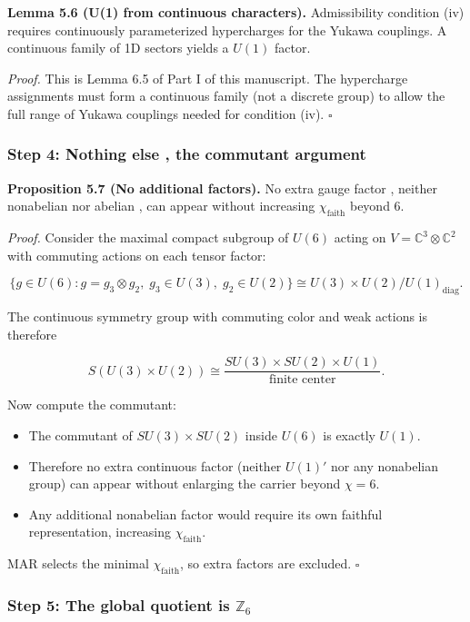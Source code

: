 \textbf{Lemma 5.6 (U(1) from continuous characters).} Admissibility condition (iv) requires continuously parameterized hypercharges for the Yukawa couplings. A continuous family of 1D sectors yields a \(U(1)\) factor.

\emph{Proof.} This is Lemma 6.5 of Part I of this manuscript. The hypercharge assignments must form a continuous family (not a discrete group) to allow the full range of Yukawa couplings needed for condition (iv). \(\square\)

\subsubsection{Step 4: Nothing else , the commutant argument}\label{step-4-nothing-else--the-commutant-argument}

\textbf{Proposition 5.7 (No additional factors).} No extra gauge factor , neither nonabelian nor abelian , can appear without increasing \(\chi_{\mathrm{faith}}\) beyond 6.

\emph{Proof.} Consider the maximal compact subgroup of \(U(6)\) acting on \(V = \mathbb{C}^3 \otimes \mathbb{C}^2\) with commuting actions on each tensor factor:

\[\{g \in U(6) : g = g_3 \otimes g_2,\; g_3 \in U(3),\; g_2 \in U(2)\} \cong U(3) \times U(2) / U(1)_{\mathrm{diag}}.\]

The continuous symmetry group with commuting color and weak actions is therefore

\[S(U(3) \times U(2)) \cong \frac{SU(3) \times SU(2) \times U(1)}{\text{finite center}}.\]

Now compute the commutant:

\begin{itemize}
\tightlist
\item
  The commutant of \(SU(3) \times SU(2)\) inside \(U(6)\) is exactly \(U(1)\).
\item
  Therefore no extra continuous factor (neither \(U(1)'\) nor any nonabelian group) can appear without enlarging the carrier beyond \(\chi = 6\).
\item
  Any additional nonabelian factor would require its own faithful representation, increasing \(\chi_{\mathrm{faith}}\).
\end{itemize}

MAR selects the minimal \(\chi_{\mathrm{faith}}\), so extra factors are excluded. \(\square\)

\subsubsection{\texorpdfstring{Step 5: The global quotient is \(\mathbb{Z}_6\)}{Step 5: The global quotient is \textbackslash mathbb\{Z\}\_6}}\label{step-5-the-global-quotient-is-mathbbz_6}

